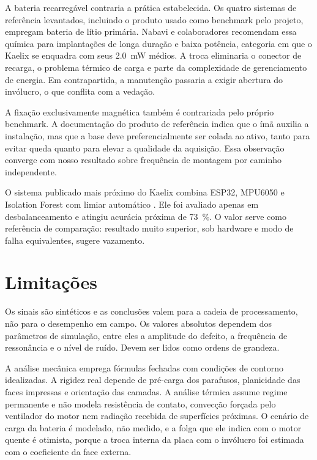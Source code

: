 \documentclass[11pt,a4paper]{article}
\begin{document}
A bateria recarregável contraria a prática estabelecida. Os quatro sistemas de referência
levantados, incluindo o produto usado como benchmark pelo projeto, empregam bateria de
lítio primária. Nabavi e colaboradores \cite{nabavi2025} recomendam essa química para implantações de
longa duração e baixa potência, categoria em que o Kaelix se enquadra com seus
\SI{2,0}{\milli\watt} médios. A troca eliminaria o conector de recarga, o problema térmico
de carga e parte da complexidade de gerenciamento de energia. Em contrapartida, a
manutenção passaria a exigir abertura do invólucro, o que conflita com a vedação.

A fixação exclusivamente magnética também é contrariada pelo próprio benchmark. A
documentação do produto de referência indica que o ímã auxilia a instalação, mas que a
base deve preferencialmente ser colada ao ativo, tanto para evitar queda quanto para
elevar a qualidade da aquisição. Essa observação converge com nosso resultado sobre
frequência de montagem por caminho independente.

O sistema publicado mais próximo do Kaelix combina ESP32, MPU6050 e Isolation Forest com
limiar automático \cite{kolok2025}. Ele foi avaliado apenas em desbalanceamento e atingiu acurácia próxima
de \SI{73}{\percent}. O valor serve como referência de comparação: resultado muito superior, sob hardware e
modo de falha equivalentes, sugere vazamento.

\section{Limitações}

Os sinais são sintéticos e as conclusões valem para a cadeia de processamento, não para o
desempenho em campo. Os valores absolutos dependem dos parâmetros de simulação, entre eles
a amplitude do defeito, a frequência de ressonância e o nível de ruído. Devem ser lidos
como ordens de grandeza.

A análise mecânica emprega fórmulas fechadas com condições de contorno idealizadas. A
rigidez real depende de pré-carga dos parafusos, planicidade das faces impressas e
orientação das camadas. A análise térmica assume regime permanente e não modela
resistência de contato, convecção forçada pelo ventilador do motor nem radiação recebida
de superfícies próximas. O cenário de carga da bateria é modelado, não medido, e a folga
que ele indica com o motor quente é otimista, porque a troca interna da placa com o
invólucro foi estimada com o coeficiente da face externa.
\end{document}
